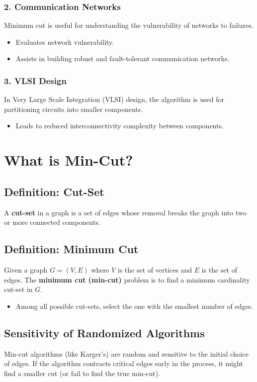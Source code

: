 \documentclass[11pt]{article}
\begin{document}
\subsubsection*{2. Communication Networks}
Minimum cut is useful for understanding the vulnerability of networks to failures.
\begin{itemize}
    \item Evaluates network vulnerability.
    \item Assists in building robust and fault-tolerant communication networks.
\end{itemize}

\subsubsection*{3. VLSI Design}
In Very Large Scale Integration (VLSI) design, the algorithm is used for partitioning circuits into smaller components.
\begin{itemize}
    \item Leads to reduced interconnectivity complexity between components.
\end{itemize}

\section{What is Min-Cut?}

\subsection{Definition: Cut-Set}
A \textbf{cut-set} in a graph is a set of edges whose removal breaks the graph into two or more connected components.

\subsection{Definition: Minimum Cut}
Given a graph $G = (V, E)$ where $V$ is the set of vertices and $E$ is the set of edges. The \textbf{minimum cut (min-cut)} problem is to find a minimum cardinality cut-set in $G$.
\begin{itemize}
    \item Among all possible cut-sets, select the one with the smallest number of edges.
\end{itemize}

\subsection{Sensitivity of Randomized Algorithms}
Min-cut algorithms (like Karger’s) are random and sensitive to the initial choice of edges. If the algorithm contracts critical edges early in the process, it might find a smaller cut (or fail to find the true min-cut).
\end{document}
